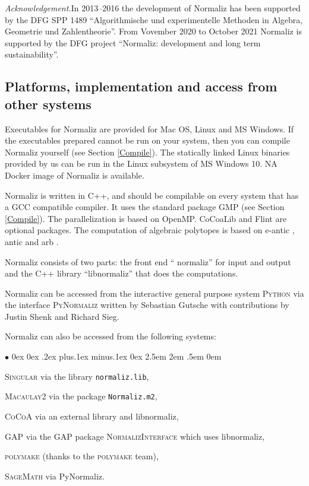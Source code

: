 \documentclass[12pt,a4paper]{scrartcl}
\newcommand{\stdli}{ \topsep0ex \partopsep0ex %
\parsep.2ex plus.1ex minus.1ex \itemsep0ex%
\leftmargin2.5em \labelwidth2em \labelsep.5em \rightmargin0em}%
\renewenvironment{itemize}{\begin{list}{{$\bullet$}}{\stdli}}{\end{list}}
\theoremstyle{definition}
\def\ttt{\texttt}
\begin{document}
\emph{Acknowledgement.}\enspace In 2013--2016 the development of Normaliz has been supported by the DFG SPP 1489  ``Algorithmische und ex\-pe\-rimentelle Methoden in Algebra, Geometrie und Zahlentheorie''. From Vovember 2020 to October 2021 Normaliz is supported by the DFG project ``Normaliz: development and long term sustainability''.

\subsection{Platforms, implementation and access from other systems}

Executables for Normaliz are provided for Mac OS, Linux and MS Windows. If the executables prepared cannot be run on your system, then you can  compile Normaliz yourself (see Section \ref{Compile}). The statically linked Linux binaries provided by us  can be run in the Linux subsystem of MS Windows 10. NA Docker image of Normaliz is available.

Normaliz is written in C++, and should be compilable on every system that has a GCC compatible compiler. It uses the standard package GMP (see Section \ref{Compile}). The parallelization is based on OpenMP. CoCoaLib \cite{CoCoA} and Flint \cite{Flint} are optional packages. The computation of algebraic polytopes is based on e-antic \cite{e-antic}, antic \cite{antic}and arb \cite{arb}.

Normaliz consists of two parts: the front end `` normaliz'' for input and output and the C++ library ``libnormaliz'' that does the computations.

Normaliz can be accessed from the interactive general purpose system \textsc{Python} via the interface \textsc{PyNormaliz} written by Sebastian Gutsche with contributions by Justin Shenk and Richard Sieg. 

Normaliz can also be accessed from the following systems:
\begin{itemize}
	\item \textsc{Singular} via the library \ttt{normaliz.lib},
	\item \textsc{Macaulay2} via the package \ttt{Normaliz.m2},
	\item \textsc{CoCoA} via an external library and libnormaliz,
	\item \textsc{GAP} via the GAP package \textsc{NormalizInterface} \cite{GAP-NmzInterface} which uses libnormaliz,
	\item \textsc{polymake} (thanks to the \textsc{polymake}
	team),
	\item \textsc{SageMath} via PyNormaliz.
\end{itemize}
\end{document}
